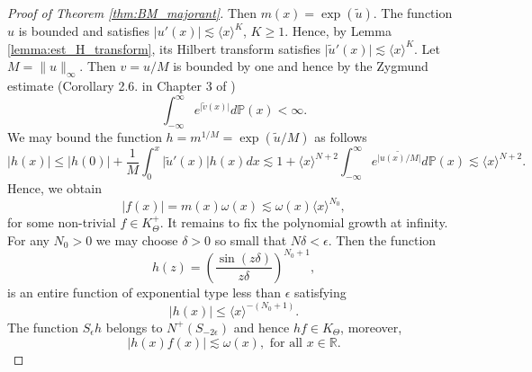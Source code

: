 \documentclass{article}[12pt]
\newcommand{\norm}[1]{\lVert#1\rVert}
\theoremstyle{remark}
\begin{document}
\begin{proof}[Proof of Theorem \ref{thm:BM_majorant}]
        Then $m(x) = \exp(\widetilde{u})$. The function $u$ is bounded and satisfies $\lvert u'(x) \lvert \lesssim \langle x \rangle^{K}$, $K \geq 1$. Hence, by Lemma \ref{lemma:est_H_transform}, its Hilbert transform satisfies $\lvert \widetilde{u}'(x) \rvert \lesssim \langle x \rangle^{K}$. Let $M = \norm{u}_{\infty}$. Then $v = u/M$ is bounded by one and hence by the Zygmund estimate (Corollary 2.6. in Chapter 3 of \cite{MR2261424})
        \begin{equation*}
            \int_{-\infty}^{\infty} e^{\lvert \widetilde{v}(x)\rvert}d\mathbb{P}(x) <\infty.
        \end{equation*}
        We may bound the function $h = m^{1/M} = \exp(\widetilde{u}/M)$ as follows
        \begin{equation*}
            \lvert h(x) \rvert \leq \lvert h(0) \rvert + \frac{1}{M}\int^{x}_{0} \lvert \widetilde{u}'(x) \rvert h(x)dx \lesssim 1 + \langle x \rangle^{N+2}\int_{-\infty}^{\infty} e^{\lvert \widetilde{u(x)/M}\rvert}d\mathbb{P}(x) \lesssim\langle x \rangle^{N+2}.
        \end{equation*}
        Hence, we obtain
        \begin{equation*}
            \lvert f(x) \rvert = m(x)\omega(x)\lesssim \omega(x)\langle x \rangle^{N_{0}},
        \end{equation*}
        for some non-trivial $f \in K^{+}_{\Theta}$. It remains to fix the polynomial growth at infinity. For any $N_{0} > 0$ we may choose $\delta > 0$ so small that $N\delta < \epsilon$. Then the function
            \begin{equation*}
                h(z) = \left(\frac{\sin(z\delta)}{z\delta}\right)^{N_{0}+1},
            \end{equation*}
            is an entire function of exponential type less than $\epsilon$ satisfying
            \begin{equation*}
                 \lvert h(x) \rvert \leq \langle x \rangle^{-(N_{0}+1)}.
            \end{equation*}
            The function $S_{\epsilon}h$ belongs to $N^{+}(S_{-2\epsilon})$ and hence $hf \in K_{\Theta}$, moreover,
            \begin{equation*}
                \lvert h(x)f(x)\rvert \lesssim\omega(x), \text{ for all } x \in \mathbb{R}.
            \end{equation*}
    \end{proof}
    


\end{document}
